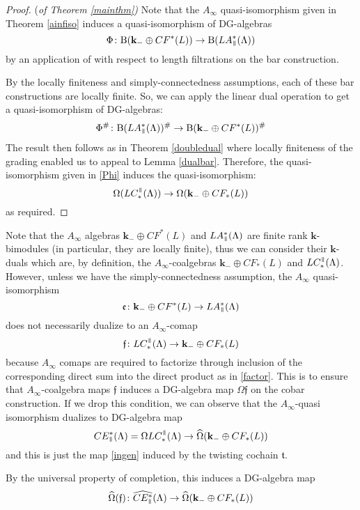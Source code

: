 \documentclass{gtpart}
\renewcommand{\k}{\mathbf{k}}
\newcommand{\e}{\mathfrak{e}}
\renewcommand{\Bar}{\mathrm{B}}
\renewcommand{\parallel}{{\mkern3mu\vphantom{\perp}\vrule depth 0pt\mkern2mu\vrule depth
0pt\mkern3mu}}
\begin{document}
\begin{proof}{(\it of Theorem \ref{mainthm})} Note that the $A_\infty$ quasi-isomorphism given in Theorem \ref{ainfiso} induces a
    quasi-isomorphism of DG-algebras
    \[ \Phi\colon \Bar(\k_{-} \oplus CF^*(L)) \to \Bar(LA_{\parallel}^*(\Lambda)) \]
by an application of \cite[Thm. 7.4]{EM} with respect to length filtrations on the bar construction.

By the locally finiteness and simply-connectedness assumptions, each of these bar constructions are
    locally finite. So, we can apply the linear dual operation to get a quasi-isomorphism of
    DG-algebras:
    \begin{align} \label{Phi} \Phi^\# \colon \Bar(LA_{\parallel}^*(\Lambda))^\# \to \Bar(\k_{-} \oplus CF^*(L))^\#
    \end{align}
    The result then follows as in Theorem \ref{doubledual} where locally finiteness of the grading
    enabled us to appeal to Lemma \ref{dualbar}. Therefore, the quasi-isomorphism given in \eqref{Phi}
    induces the quasi-isomorphism:
  \[ \Omega(LC^{\parallel}_*(\Lambda)) \to \Omega(\k_{-} \oplus CF_*(L))  \]
as required. 
\end{proof}

Note that the $A_\infty$ algebras $\k_{-} \oplus CF^*(L)$ and
$LA^*_{\parallel}(\Lambda)$ are finite rank $\k$-bimodules (in particular, they are locally
finite), thus we can consider their $\k$-duals which are, by definition, the $A_\infty$-coalgebras
$\k_{-} \oplus CF_*(L)$ and $LC_*^{\parallel}(\Lambda)$. However, unless we have the simply-connectedness assumption, the $A_\infty$
quasi-isomorphism 
\[ \e \colon \k_{-} \oplus CF^*(L) \to LA_{\parallel}^* (\Lambda) \] 
does not necessarily dualize to an $A_\infty$-comap 
\[ \mathfrak{f}\colon  LC_*^{\parallel}(\Lambda) \to \k_{-} \oplus CF_*(L) \] 
because $A_\infty$ comaps are required to factorize through inclusion of the corresponding direct
sum into the direct product as in \eqref{factor}. This is to ensure that
$A_\infty$-coalgebra maps $\mathfrak{f}$ induces a DG-algebra map $\Omega \mathfrak{f}$ on the cobar
construction. If we drop this condition, we can observe that the $A_\infty$-quasi isomorphism
dualizes to DG-algebra map 
\[ CE^*_{\parallel}(\Lambda) = \Omega LC_{*}^{\parallel}(\Lambda) \to \widehat{\Omega}(\k_{-} \oplus CF_*(L)) \] and this is just the map \eqref{ingen} induced by the twisting cochain $\mathfrak{t}$. 

By the universal property of completion, this induces a DG-algebra map
\[ \widehat{\Omega}(\mathfrak{f})\colon \widehat{CE^*_{\parallel}}(\Lambda) \to \widehat{\Omega} (\k_{-} \oplus CF_*(L))\]  
\end{document}
